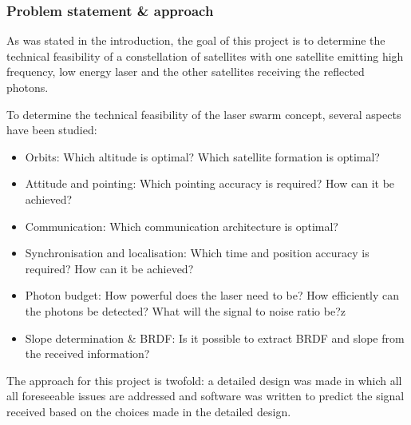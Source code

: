 \subsubsection{Problem statement \& approach}
\label{Probstat}

As was stated in the introduction, the goal of this project is to determine the technical feasibility of a constellation of satellites with one satellite emitting high frequency, low energy laser and the other satellites receiving the reflected photons.

To determine the technical feasibility of the laser swarm concept, several aspects have been studied:

\begin{itemize}
\item Orbits: Which altitude is optimal? Which satellite formation is optimal?
\item Attitude and pointing: Which pointing accuracy is required? How can it be achieved?
\item Communication: Which communication architecture is optimal?
\item Synchronisation and localisation: Which time and position accuracy is required? How can it be achieved?
\item Photon budget: How powerful does the laser need to be? How efficiently can the photons be detected? What will the signal to noise ratio be?z
\item Slope determination \& BRDF: Is it possible to extract BRDF and slope from the received information?
\end{itemize}

The approach for this project is twofold: a detailed design was made in which all all foreseeable issues are addressed and software was written to predict the signal received based on the choices made in the detailed design.